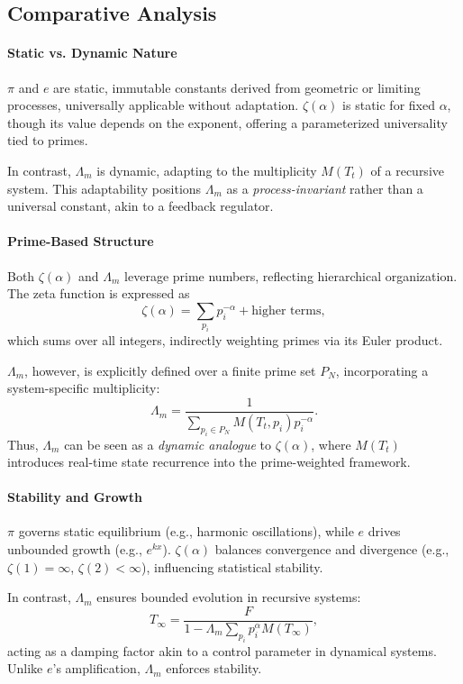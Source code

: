 \documentclass{article}
\theoremstyle{plain}
\begin{document}
\subsection{Comparative Analysis}

\paragraph{Static vs. Dynamic Nature}
\(\pi\) and \(e\) are static, immutable constants derived from geometric or limiting processes, universally applicable without adaptation. \(\zeta(\alpha)\) is static for fixed \(\alpha\), though its value depends on the exponent, offering a parameterized universality tied to primes. 

In contrast, \(\Lambda_m\) is dynamic, adapting to the multiplicity \(M(T_t)\) of a recursive system. This adaptability positions \(\Lambda_m\) as a \textit{process-invariant} rather than a universal constant, akin to a feedback regulator.

\paragraph{Prime-Based Structure}
Both \(\zeta(\alpha)\) and \(\Lambda_m\) leverage prime numbers, reflecting hierarchical organization. The zeta function is expressed as
\[
\zeta(\alpha) = \sum_{p_i} p_i^{-\alpha} + \text{higher terms},
\]
which sums over all integers, indirectly weighting primes via its Euler product. 

\(\Lambda_m\), however, is explicitly defined over a finite prime set \(P_N\), incorporating a system-specific multiplicity:
\[
\Lambda_m = \frac{1}{\sum_{p_i \in P_N} M(T_t, p_i) p_i^{-\alpha}}.
\]
Thus, \(\Lambda_m\) can be seen as a \textit{dynamic analogue} to \(\zeta(\alpha)\), where \(M(T_t)\) introduces real-time state recurrence into the prime-weighted framework.

\paragraph{Stability and Growth}
\(\pi\) governs static equilibrium (e.g., harmonic oscillations), while \(e\) drives unbounded growth (e.g., \(e^{kx}\)). \(\zeta(\alpha)\) balances convergence and divergence (e.g., \(\zeta(1) = \infty\), \(\zeta(2) < \infty\)), influencing statistical stability.

In contrast, \(\Lambda_m\) ensures bounded evolution in recursive systems:
\[
T_\infty = \frac{F}{1 - \Lambda_m \sum_{p_i} p_i^\alpha M(T_\infty)},
\]
acting as a damping factor akin to a control parameter in dynamical systems. Unlike \(e\)'s amplification, \(\Lambda_m\) enforces stability.
\end{document}
